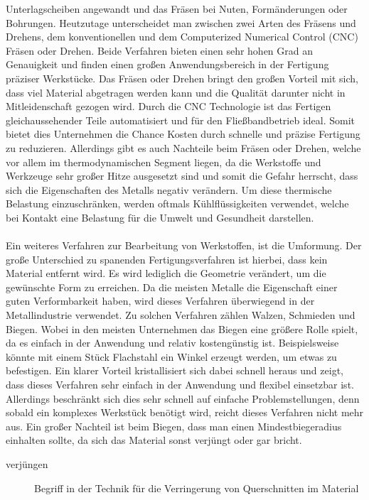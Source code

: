 Unterlagscheiben angewandt und das Fräsen bei \zB Nuten, Formänderungen oder Bohrungen. Heutzutage unterscheidet man zwischen zwei Arten des Fräsens 
und Drehens, dem konventionellen und dem Computerized Numerical Control (CNC) Fräsen oder Drehen. Beide Verfahren bieten einen sehr hohen Grad an Genauigkeit 
und finden einen großen Anwendungsbereich in der Fertigung präziser Werkstücke. Das Fräsen oder Drehen bringt den großen Vorteil mit sich, dass viel Material 
abgetragen werden kann und die Qualität darunter nicht in Mitleidenschaft gezogen wird. Durch die CNC Technologie ist das Fertigen gleichaussehender Teile 
automatisiert und für den Fließbandbetrieb ideal. Somit bietet dies Unternehmen die Chance Kosten durch schnelle und präzise Fertigung zu reduzieren. 
Allerdings gibt es auch Nachteile beim Fräsen oder Drehen, welche vor allem im thermodynamischen Segment liegen, da die Werkstoffe und Werkzeuge sehr 
großer Hitze ausgesetzt sind und somit die Gefahr herrscht, dass sich die Eigenschaften \zB des Metalls negativ verändern. Um diese thermische Belastung 
einzuschränken, werden oftmals Kühlflüssigkeiten verwendet, welche bei Kontakt eine Belastung für die Umwelt und Gesundheit darstellen. %
\\\\
Ein weiteres Verfahren zur Bearbeitung von Werkstoffen, ist die Umformung. Der große Unterschied zu spanenden Fertigungsverfahren ist hierbei, dass kein 
Material entfernt wird. Es wird lediglich die Geometrie verändert, um die gewünschte Form zu erreichen. Da die meisten Metalle die Eigenschaft einer guten 
Verformbarkeit haben, wird dieses Verfahren überwiegend in der Metallindustrie verwendet. Zu solchen Verfahren zählen \zB Walzen, Schmieden und Biegen. Wobei 
in den meisten Unternehmen das Biegen eine größere Rolle spielt, da es einfach in der Anwendung und relativ kostengünstig ist. Beispielsweise könnte mit einem 
Stück Flachstahl ein Winkel erzeugt werden, um etwas zu befestigen. Ein klarer Vorteil kristallisiert sich dabei schnell heraus und zeigt, dass dieses 
Verfahren sehr einfach in der Anwendung und flexibel einsetzbar ist. Allerdings beschränkt sich dies sehr schnell auf einfache Problemstellungen, denn 
sobald ein komplexes Werkstück benötigt wird, reicht dieses Verfahren nicht mehr aus. Ein großer Nachteil ist beim Biegen, dass man einen Mindestbiegeradius 
einhalten sollte, da sich das Material sonst verjüngt oder gar bricht.
\begin{description}
\item[verjüngen] Begriff in der Technik für die Verringerung von Querschnitten im Material
\end{description}
